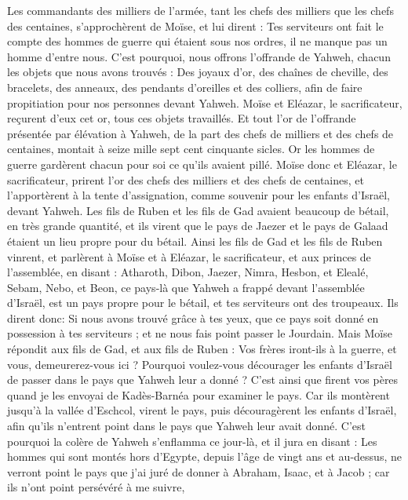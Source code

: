 \begin{multicols}{2}
Les commandants des milliers de l'armée, tant les chefs des milliers que les chefs des centaines, s'approchèrent de Moïse,
et lui dirent : Tes serviteurs ont fait le compte des hommes de guerre qui étaient sous nos ordres, il ne manque pas un homme d'entre nous.
C'est pourquoi, nous offrons l'offrande de Yahweh, chacun les objets que nous avons trouvés : Des joyaux d'or, des chaînes de cheville, des bracelets, des anneaux, des pendants d'oreilles et des colliers, afin de faire propitiation pour nos personnes devant Yahweh.
Moïse et Eléazar, le sacrificateur, reçurent d'eux cet or, tous ces objets travaillés.
Et tout l'or de l'offrande présentée par élévation à Yahweh, de la part des chefs de milliers et des chefs de centaines, montait à seize mille sept cent cinquante sicles.
Or les hommes de guerre gardèrent chacun pour soi ce qu'ils avaient pillé.
Moïse donc et Eléazar, le sacrificateur, prirent l'or des chefs des milliers et des chefs de centaines, et l'apportèrent à la tente d'assignation, comme souvenir pour les enfants d'Israël, devant Yahweh.
\VerseOne{}Les fils de Ruben et les fils de Gad avaient beaucoup de bétail, en très grande quantité, et ils virent que le pays de Jaezer et le pays de Galaad étaient un lieu propre pour du bétail.
Ainsi les fils de Gad et les fils de Ruben vinrent, et parlèrent à Moïse et à Eléazar, le sacrificateur, et aux princes de l'assemblée, en disant :
Atharoth, Dibon, Jaezer, Nimra, Hesbon, et Elealé, Sebam, Nebo, et Beon,
ce pays-là que Yahweh a frappé devant l'assemblée d'Israël, est un pays propre pour le bétail, et tes serviteurs ont des troupeaux.
Ils dirent donc: Si nous avons trouvé grâce à tes yeux, que ce pays soit donné en possession à tes serviteurs ; et ne nous fais point passer le Jourdain.
Mais Moïse répondit aux fils de Gad, et aux fils de Ruben : Vos frères iront-ils à la guerre, et vous, demeurerez-vous ici ?
Pourquoi voulez-vous décourager les enfants d'Israël de passer dans le pays que Yahweh leur a donné ?
C'est ainsi que firent vos pères quand je les envoyai de Kadès-Barnéa pour examiner le pays.
Car ils montèrent jusqu'à la vallée d'Eschcol, virent le pays, puis découragèrent les enfants d'Israël, afin qu'ils n'entrent point dans le pays que Yahweh leur avait donné.
C'est pourquoi la colère de Yahweh s'enflamma ce jour-là, et il jura en disant :
Les hommes qui sont montés hors d'Egypte, depuis l'âge de vingt ans et au-dessus, ne verront point le pays que j'ai juré de donner à Abraham, Isaac, et à Jacob ; car ils n'ont point persévéré à me suivre,

\end{multicols}

